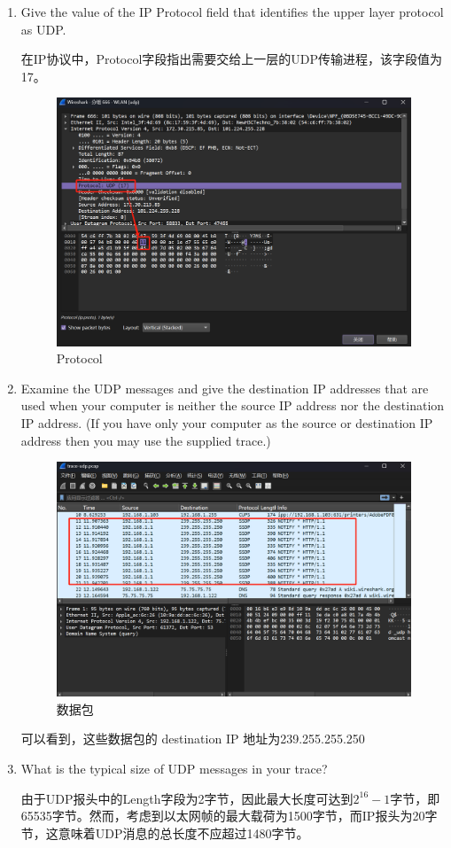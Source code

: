 \documentclass{article}
\begin{document}
	\begin{enumerate}[label={\arabic*})]
		\item Give the value of the IP Protocol field that identifies the upper layer protocol as UDP.
		
		在IP协议中，Protocol字段指出需要交给上一层的UDP传输进程，该字段值为17。
		
		\begin{figure}[H]
			\centering
			\includegraphics[width=11cm]{images/11.Protocol.png}
			\caption{Protocol}
		\end{figure}
		
		\item Examine the UDP messages and give the destination IP addresses that are used when your computer is neither the source IP address nor the destination IP address. (If you have only your computer as the source or destination IP address then you may use the supplied trace.)
		
		\begin{figure}[H]
			\centering
			\includegraphics[width=11cm]{images/12.数据包.png}
			\caption{数据包}
		\end{figure}
		
		可以看到，这些数据包的 destination IP 地址为239.255.255.250
		
		\item What is the typical size of UDP messages in your trace?
		
		由于UDP报头中的Length字段为2字节，因此最大长度可达到$2^{16} - 1$字节，即65535字节。然而，考虑到以太网帧的最大载荷为1500字节，而IP报头为20字节，这意味着UDP消息的总长度不应超过1480字节。
		
	\end{enumerate}
	
\end{document}
